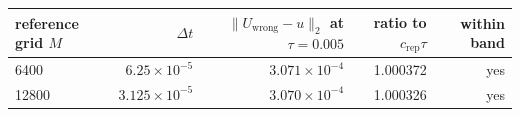 \begin{tabular}{lrrrr}
\toprule
reference grid $M$ & $\Delta t$ & $\|U_{\mathrm{wrong}} - u\|_2$ at $\tau = 0.005$ & ratio to $c_{\mathrm{rep}}\tau$ & within band \\
\midrule
6400 & $6.25\times10^{-5}$ & $3.071\times10^{-4}$ & 1.000372 & yes \\
12800 & $3.125\times10^{-5}$ & $3.070\times10^{-4}$ & 1.000326 & yes \\
\bottomrule
\end{tabular}
